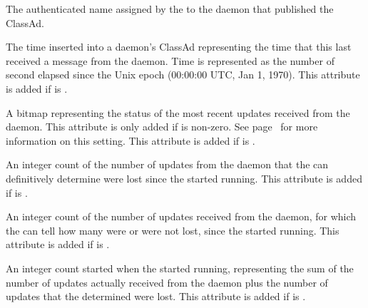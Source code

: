 \begin{description}

\item[\AdAttr{AuthenticatedIdentity}:] The authenticated name assigned
  by the  to the daemon that published the ClassAd.

\item[\AdAttr{LastHeardFrom}:] The time inserted into a daemon's
  ClassAd representing the time that this 
  last received a message from the daemon.
  Time is  represented as the number of second elapsed since
  the Unix epoch (00:00:00 UTC, Jan 1, 1970).
  This attribute is added if  is .

\item[\AdAttr{UpdatesHistory}:] A bitmap representing the status of
  the most recent updates received from the daemon. 
  This attribute is only added if 
  is non-zero. 
  See page~\pageref{param:CollectorDaemonHistorySize} for more information on
  this setting.
  This attribute is added if  is .

\item[\AdAttr{UpdatesLost}:] An integer count of the number of updates
  from the daemon that the  can definitively determine
  were lost since the  started running.
  This attribute is added if  is .

\item[\AdAttr{UpdatesSequenced}:] An integer count of the number of updates
  received from the daemon,
  for which the  can tell how many were or were not lost,
  since the  started running.
  This attribute is added if  is .

\item[\AdAttr{UpdatesTotal}:] An integer count started when the
   started running, representing the sum
  of the number of updates actually received from the daemon plus
  the number of updates that the  determined were lost.
  This attribute is added if  is .

\end{description}

